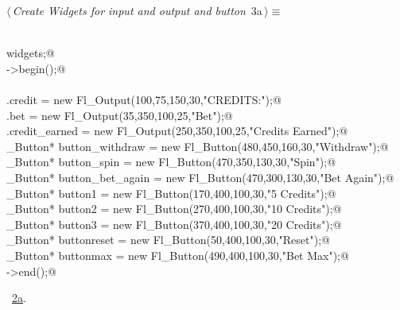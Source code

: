 \documentclass{article}
\renewcommand{\NWtarget}[2]{\hypertarget{#1}{#2}}
\renewcommand{\NWlink}[2]{\hyperlink{#1}{#2}}
\begin{document}
\begin{flushleft} \small
\begin{minipage}{\linewidth}\label{scrap3}\raggedright\small
\NWtarget{nuweb3a}{} $\langle\,${\it Create Widgets for input and output and button}\nobreak\ {\footnotesize {3a}}$\,\rangle\equiv$
\vspace{-1ex}
\begin{list}{}{} \item
\mbox{}\verb@@\\
\mbox{}\verb@Widgets widgets;@\\
\mbox{}\verb@w->begin();@\\
\mbox{}\verb@@\\
\mbox{}\verb@widgets.credit = new Fl_Output(100,75,150,30,"CREDITS:");@\\
\mbox{}\verb@widgets.bet = new Fl_Output(35,350,100,25,"Bet");@\\
\mbox{}\verb@widgets.credit_earned = new Fl_Output(250,350,100,25,"Credits Earned");@\\
\mbox{}\verb@Fl_Button* button_withdraw = new Fl_Button(480,450,160,30,"Withdraw");@\\
\mbox{}\verb@Fl_Button* button_spin = new Fl_Button(470,350,130,30,"Spin");@\\
\mbox{}\verb@Fl_Button* button_bet_again = new Fl_Button(470,300,130,30,"Bet Again");@\\
\mbox{}\verb@Fl_Button* button1 = new Fl_Button(170,400,100,30,"5 Credits");@\\
\mbox{}\verb@Fl_Button* button2 = new Fl_Button(270,400,100,30,"10 Credits");@\\
\mbox{}\verb@Fl_Button* button3 = new Fl_Button(370,400,100,30,"20 Credits");@\\
\mbox{}\verb@Fl_Button* buttonreset = new Fl_Button(50,400,100,30,"Reset");@\\
\mbox{}\verb@Fl_Button* buttonmax = new Fl_Button(490,400,100,30,"Bet Max");@\\
\mbox{}\verb@w->end();@\\
\mbox{}\verb@@{\NWsep}
\end{list}
\vspace{-1.5ex}
\footnotesize
\begin{list}{}{\setlength{\itemsep}{-\parsep}\setlength{\itemindent}{-\leftmargin}}
\item \NWtxtMacroRefIn\ \NWlink{nuweb2a}{2a}.

\item{}
\end{list}
\end{minipage}\vspace{4ex}
\end{flushleft}
\end{document}
